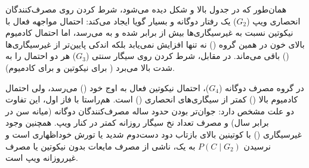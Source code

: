 \documentclass[12pt]{exam}
\begin{document}
\begin{table}[htbp]
\centering
\caption{احتمال‌های شرطی کادمیوم بالا ($B$) و نیکوتین فعال ($C$) به شرط وضعیت احتراقی ($A, A^c$) و چهار گروه افراز ($G_1$ تا $G_4$)}
\end{table}

همان‌طور که در جدول بالا و شکل  دیده می‌شود، شرط کردن روی مصرف‌کنندگان انحصاری ویپ ($G_2$) یک رفتار دوگانه و بسیار گویا ایجاد می‌کند: احتمال مواجهه فعال با نیکوتین نسبت به غیرسیگاری‌ها بیش از  برابر شده و به  می‌رسد، اما احتمال کادمیوم بالای خون در همین گروه () نه تنها افزایش نمی‌یابد بلکه اندکی پایین‌تر از غیرسیگاری‌ها () باقی می‌ماند. در مقابل، شرط کردن روی سیگار سنتی ($G_3$) هر دو احتمال را به شدت بالا می‌برد ( برای نیکوتین و  برای کادمیوم).

در گروه مصرف دوگانه ($G_4$)، احتمال نیکوتین فعال به اوج خود () می‌رسد، ولی احتمال کادمیوم بالا () کمتر از سیگاری‌های انحصاری () است. هم‌راستا با فاز اول، این تفاوت دو علت مشخص دارد: جوان‌تر بودن حدود  ساله مصرف‌کنندگان دوگانه (میانه سن  در برابر  سال) و مصرف تعداد نخ سیگار روزانه کمتر در کنار ویپ. همچنین وجود  غیرسیگاری () با کوتینین بالای  بازتاب دود دست‌دوم شدید یا تورش خوداظهاری است و نرسیدن $P(C \mid G_2)$ به یک، ناشی از مصرف مایعات بدون نیکوتین یا مصرف غیرروزانه ویپ است.
\end{document}
